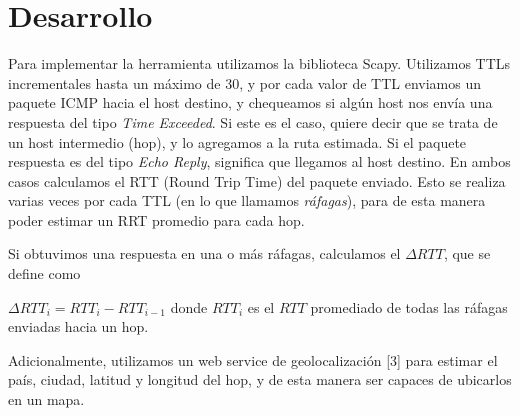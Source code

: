 \section{Desarrollo}

Para implementar la herramienta utilizamos la biblioteca Scapy. Utilizamos TTLs incrementales hasta un máximo de 30, y por cada valor de TTL enviamos un paquete ICMP hacia el host destino, y chequeamos si algún host nos envía una respuesta del tipo \textit{Time Exceeded}. Si este es el caso, quiere decir que se trata de un host intermedio (hop), y lo agregamos a la ruta estimada. Si el paquete respuesta es del tipo \textit{Echo Reply}, significa que llegamos al host destino. En ambos casos calculamos el RTT (Round Trip Time) del paquete enviado. Esto se realiza varias veces por cada TTL (en lo que llamamos \textit{ráfagas}), para de esta manera poder estimar un RRT promedio para cada hop.

Si obtuvimos una respuesta en una o más ráfagas, calculamos el $\Delta RTT$, que se define como

$\Delta RTT_{i} = RTT_{i} - RTT_{i-1}$ donde $RTT_{i}$ es el $RTT$ promediado de todas las ráfagas enviadas hacia un hop.

Adicionalmente, utilizamos un web service de geolocalización [3] para estimar el país, ciudad, latitud y longitud del hop, y de esta manera ser capaces de ubicarlos en un mapa.